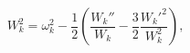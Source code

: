 \begin{equation}\label{eq:W}
W_k^2=\omega_k^2-\frac{1}{2}\left(\frac{W_k''}{W_k}-\frac{3}{2}
\frac{W_k'^2}{W_k^2}\right),
\end{equation}

